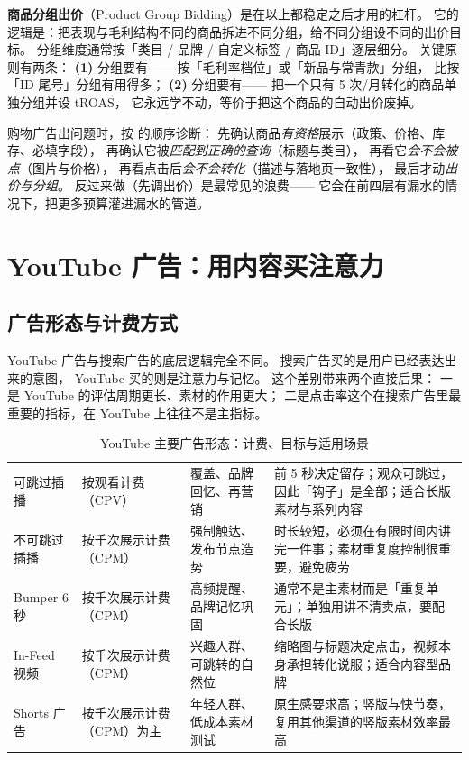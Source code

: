 \textbf{商品分组出价}（Product Group Bidding）是在以上都稳定之后才用的杠杆。
它的逻辑是：把表现与毛利结构不同的商品拆进不同分组，给不同分组设不同的出价目标。
分组维度通常按「类目 / 品牌 / 自定义标签 / 商品 ID」逐层细分。
关键原则有两条：
\textbf{(1)} 分组要有——
按「毛利率档位」或「新品与常青款」分组，
比按「ID 尾号」分组有用得多；
\textbf{(2)} 分组要有——
把一个只有 5 次/月转化的商品单独分组并设 tROAS，
它永远学不动，等价于把这个商品的自动出价废掉。

\begin{keypoint}[购物广告的诊断顺序]
购物广告出问题时，按
的顺序诊断：
先确认商品\emph{有资格}展示（政策、价格、库存、必填字段），
再确认它被\emph{匹配到正确的查询}（标题与类目），
再看它\emph{会不会被点}（图片与价格），
再看点击后\emph{会不会转化}（描述与落地页一致性），
最后才动\emph{出价与分组}。
反过来做（先调出价）是最常见的浪费——
它会在前四层有漏水的情况下，把更多预算灌进漏水的管道。
\end{keypoint}

\section{YouTube 广告：用内容买注意力}
\label{sec:g-youtube}

\subsection{广告形态与计费方式}

YouTube 广告与搜索广告的底层逻辑完全不同。
搜索广告买的是用户已经表达出来的意图，
YouTube 买的则是注意力与记忆。
这个差别带来两个直接后果：
一是 YouTube 的评估周期更长、素材的作用更大；
二是点击率这个在搜索广告里最重要的指标，在 YouTube 上往往不是主指标。

\begin{table}[htbp]
\centering
\caption{YouTube 主要广告形态：计费、目标与适用场景}
\label{tab:g-yt-format}
\small
\begin{tabularx}{\textwidth}{L{2.9cm} L{2.4cm} L{2.8cm} Y}
\toprule
{} &  &  &  \\
\midrule
可跳过插播 & 按观看计费（CPV） & 覆盖、品牌回忆、再营销 & 前 5 秒决定留存；观众可跳过，因此「钩子」是全部；适合长版素材与系列内容 \\
\addlinespace
不可跳过插播 & 按千次展示计费（CPM） & 强制触达、发布节点造势 & 时长较短，必须在有限时间内讲完一件事；素材重复度控制很重要，避免疲劳 \\
\addlinespace
Bumper 6 秒 & 按千次展示计费（CPM） & 高频提醒、品牌记忆巩固 & 通常不是主素材而是「重复单元」；单独用讲不清卖点，要配合长版 \\
\addlinespace
In-Feed 视频 & 按千次展示计费（CPM） & 兴趣人群、可跳转的自然位 & 缩略图与标题决定点击，视频本身承担转化说服；适合内容型品牌 \\
\addlinespace
Shorts 广告 & 按千次展示计费（CPM）为主 & 年轻人群、低成本素材测试 & 原生感要求高；竖版与快节奏，复用其他渠道的竖版素材效率最高 \\
\bottomrule
\end{tabularx}
\end{table}

